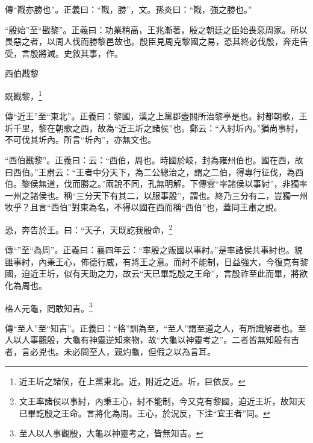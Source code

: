 {\noindent\zhuan{}\fzbyks 傳“戡亦勝也”。正義曰：“戡，勝”，文。孫炎曰：“戡，強之勝也。” \par}

{\noindent\shu{}\fzkt “殷始”至“戡黎”。正義曰：功業稍高，王兆漸著，殷之朝廷之臣始畏惡周家。所以畏惡之者，以周人伐而勝黎邑故也。殷臣見周克黎國之易，恐其終必伐殷，奔走告受，言殷將滅。史敘其事，作。 \par}

西伯戡黎

既戡黎，\footnote{近王圻之諸侯，在上黨東北。近，附近之近。圻，巨依反。}


{\noindent\zhuan{}\fzbyks 傳“近王”至“東北”。正義曰：黎國，漢之上黨郡壺關所治黎亭是也。紂都朝歌，王圻千里，黎在朝歌之西，故為“近王圻之諸侯”也。鄭云：“入紂圻內。”猶尚事紂，不可伐其圻內。所言“圻內”，亦無文也。 \par}

{\noindent\shu{}\fzkt “西伯戡黎”。正義曰：云：“西伯，周也。時國於岐，封為雍州伯也。國在西，故曰西伯。”王肅云：“王者中分天下，為二公總治之，謂之二伯，得專行征伐，為西伯。黎侯無道，伐而勝之。”兩說不同，孔無明解。下傳雲“率諸侯以事紂”，非獨率一州之諸侯也。稱“三分天下有其二，以服事殷”，謂也。終乃三分有二，豈獨一州牧乎？且言“西伯”對東為名，不得以國在西而稱“西伯”也，蓋同王肅之說。 \par}

恐，奔告於王。曰：“天子，天既訖我殷命，\footnote{文王率諸侯以事紂，內秉王心，紂不能制，今又克有黎國，迫近王圻，故知天已畢訖殷之王命。言將化為周。王心，於況反，下注“宜王者”同。}

{\noindent\zhuan{}\fzbyks 傳“”至“為周”。正義曰：襄四年云：“率殷之叛國以事紂。”是率諸侯共事紂也。貌雖事紂，內秉王心，佈德行威，有將王之意。而紂不能制，日益強大，今復克有黎國，迫近王圻，似有天助之力，故云“天已畢訖殷之王命”，言殷祚至此而畢，將欲化為周也。 \par}

格人元龜，罔敢知吉。\footnote{至人以人事觀殷，大龜以神靈考之，皆無知吉。}

{\noindent\zhuan{}\fzbyks 傳“至人”至“知吉”。正義曰：“格”訓為至，“至人”謂至道之人，有所識解者也。至人以人事觀殷，大龜有神靈逆知來物，故“大龜以神靈考之”。二者皆無知殷有吉者，言必兇也。未必問至人，親灼龜，但假之以為言耳。 \par}

